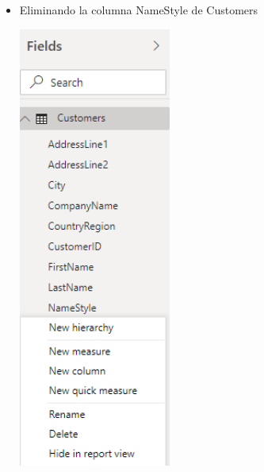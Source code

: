 \begin{itemize}
	\item Eliminando la columna NameStyle de Customers
	\begin{center}
	\includegraphics[width=5cm]{./Imagenes/Captura2-2} 
	\end{center}
\end{itemize} 

